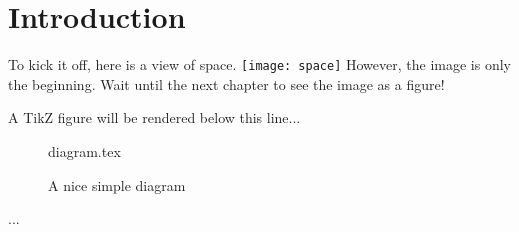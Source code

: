 \documentclass[float=false, crop=false]{standalone}
\begin{document}
\chapter{Introduction}
To kick it off, here is a view of space. 
\texttt{[image: space]}
However, the image is only the beginning. Wait until the next chapter to see the image as a figure!

A TikZ figure will be rendered below this line...
 
 
\begin{figure}[ht]
 
{diagram.tex}
 
\label{fig:tikzexample}
\caption{A nice simple diagram}
\end{figure}
 
...
\end{document}
